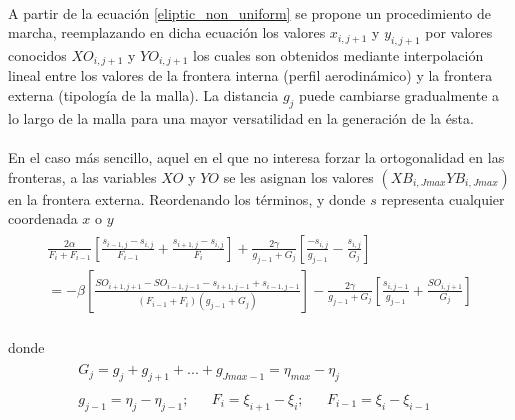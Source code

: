 \documentclass[letterpaper, openright, 12pt]{book}
\begin{document}
    \paragraph*{}
        A partir de la ecuación \ref{eliptic_non_uniform} se propone un
        procedimiento de marcha, reemplazando en dicha ecuación los valores
        $x_{i, j + 1}$ y $y_{i, j+1}$ por valores conocidos $XO_{i, j + 1}$ y
        $YO_{i, j + 1}$ los cuales son obtenidos mediante interpolación lineal
        entre los valores de la frontera interna (perfil aerodinámico) y la
        frontera externa (tipología de la malla). La distancia $g_j$ puede
        cambiarse gradualmente a lo largo de la malla para una mayor
        versatilidad en la generación de la ésta.
    \paragraph*{}
        En el caso más sencillo, aquel en el que no interesa forzar la
        ortogonalidad en las fronteras, a las variables $XO$ y $YO$ se les
        asignan los valores $(XB_{i, Jmax} YB_{i, Jmax})$ en la frontera
        externa. Reordenando los términos, y donde $s$ representa cualquier
        coordenada $x$ o $y$\\
        \begin{align}
            \begin{aligned}
                \frac{2\alpha}{F_i + F_{i - 1}} \left[ \frac{s_{i-1, j} - s_{i, j}}{F_{i - 1}} + \frac{s_{i+1, j} - s_{i, j}}{F_i} \right] + \frac{2\gamma}{g_{j - 1} + G_j} \left[ \frac{-s_{i, j}}{g_{j - 1}} - \frac{s_{i, j}}{G_j} \right]\\
                = -\beta \left[ \frac{ SO_{i+1, j+1} - SO_{i-1, j-1} - s_{i+1, j-1} + s_{i-1, j-1} }{ (F_{i - 1} + F_i) (g_{j - 1} + G_j) } \right] - \frac{2\gamma}{g_{j-1} + G_j} \left[ \frac{s_{i, j - 1}}{g_{j - 1}} + \frac{SO_{i, j + 1}}{G_j} \right]
            \end{aligned}
            \label{eliptic_non_uniform1}
        \end{align}\\
        donde
        \begin{align*}
            &\begin{aligned}
            G_j = g_j + g_{j + 1} + ... + g_{Jmax - 1} = \eta_{max} - \eta_j
            \end{aligned}\\
            &\begin{aligned}
            g_{j - 1} = \eta_j - \eta_{j - 1};&& F_i = \xi_{i + 1} - \xi_i; && F_{i - 1} = \xi_i - \xi_{i - 1}&&
            \end{aligned}
        \end{align*}\\
\end{document}
